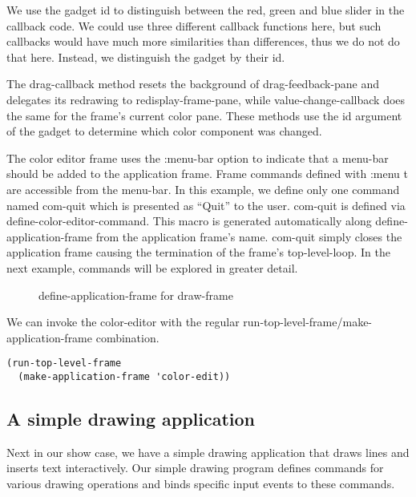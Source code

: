 \documentclass[twocolumn,a4paper]{article}
\newcommand {\code}[1]{{\sffamily #1}}
\let\class\code
\let\method\code
\let\variable\code
\let\macro\code
\let\keyword\code
\begin{document}
We use the gadget id to distinguish between the red, green and blue slider in the callback code. We could use three different callback functions here, but such callbacks would have much more similarities than differences, thus we do not do that here. Instead, we distinguish the gadget by their \variable{id}. 

The \method{drag-callback} method resets the background of \variable{drag-feedback-pane} and delegates its redrawing to \method{redisplay-frame-pane}, while \method{value-change-callback} does the same for the frame's current color pane. These methods use the \variable{id} argument of the gadget to determine which color component was changed.

The color editor frame uses the \keyword{:menu-bar} option to indicate that a menu-bar should be added to the application frame. Frame commands defined with \code{:menu t} are accessible from the menu-bar. In this example, we define only one command named \code{com-quit} which is presented as ``Quit'' to the user. \code{com-quit} is defined via \macro{define-color-editor-command}. This macro is generated automatically along \macro{define-application-frame} from the application frame's name. \code{com-quit} simply closes the application frame causing the termination of the frame's top-level-loop. In the next example, commands will be explored in greater detail.


\begin{figure*}[t]
\lstset{style=framestyle}

\caption{define-application-frame for \class{draw-frame}}\label{fig-draw-defapp}\label{fig-draw-handlerepaint}
\end{figure*}

We can invoke the color-editor with the regular \method{run-top-level-frame}/\method{make-application-frame} combination.
\lstset{style=inlinestyle}
\begin{lstlisting}
(run-top-level-frame 
  (make-application-frame 'color-edit))
\end{lstlisting}


\subsection{A simple drawing application}

Next in our show case, we have a simple drawing application that draws lines and inserts text interactively. Our simple drawing program defines commands for various drawing operations and binds specific input events to these commands.
\end{document}
